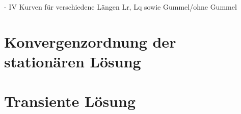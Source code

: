 



- IV Kurven für verschiedene Längen Lr, Lq sowie Gummel/ohne Gummel

\section{Konvergenzordnung der stationären Lösung}\label{sec:rates}


\section{Transiente Lösung}\label{sec:transient}
